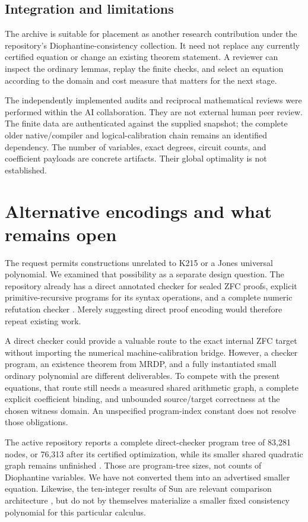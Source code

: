 \documentclass[11pt,a4paper]{article}
\theoremstyle{definition}
\theoremstyle{remark}
\numberwithin{equation}{section}
\begin{document}
\subsection{Integration and limitations}

The archive is suitable for placement as another research contribution
under the repository's Diophantine-consistency collection. It need not
replace any currently certified equation or change an existing theorem
statement. A reviewer can inspect the ordinary lemmas, replay the finite
checks, and select an equation according to the domain and cost measure
that matters for the next stage.

The independently implemented audits and reciprocal mathematical reviews
were performed within the AI collaboration. They are not external human
peer review. The finite data are authenticated against the supplied
snapshot; the complete older native/compiler and logical-calibration
chain remains an identified dependency. The number of variables, exact
degrees, circuit counts, and coefficient payloads are concrete artifacts.
Their global optimality is not established.

\section{Alternative encodings and what remains open}
\label{sec:alternatives}

The request permits constructions unrelated to K215 or a Jones universal
polynomial. We examined that possibility as a separate design question.
The repository already has a direct annotated checker for sealed ZFC
proofs, explicit primitive-recursive programs for its syntax operations,
and a complete numeric refutation checker \cite{repo}. Merely suggesting
direct proof encoding would therefore repeat existing work.

A direct checker could provide a valuable route to the exact internal
ZFC target without importing the numerical machine-calibration bridge.
However, a checker program, an existence theorem from MRDP, and a
fully instantiated small ordinary polynomial are different deliverables.
To compete with the present equations, that route still needs a measured
shared arithmetic graph, a complete explicit coefficient binding, and
unbounded source/target correctness at the chosen witness domain.
An unspecified program-index constant does not resolve those obligations.

The active repository reports a complete direct-checker program tree of
83,281 nodes, or 76,313 after its certified optimization, while its
smaller shared quadratic graph remains unfinished \cite{repo}.
Those are program-tree sizes, not counts of Diophantine variables.
We have not converted them into an advertised smaller equation.
Likewise, the ten-integer results of Sun are relevant comparison
architecture \cite{sun}, but do not by themselves materialize a smaller
fixed consistency polynomial for this particular calculus.
\end{document}

